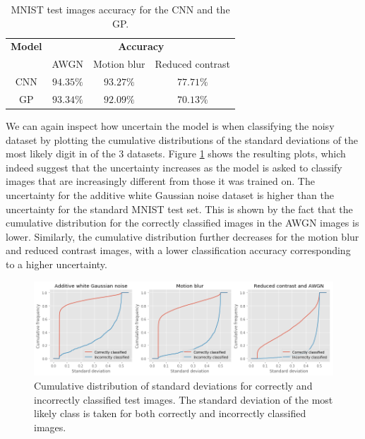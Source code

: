 \documentclass{article}
\begin{document}
\begin{table}[h]
\centering	
{\renewcommand{\arraystretch}{1.4} %
\begin{tabular}{ c | c c c}
\textbf{Model} & \multicolumn{3}{c}{\textbf{Accuracy}}\\
& AWGN & Motion blur & Reduced contrast\\
\hline
CNN & $94.35\%$ & $93.27\%$ & $77.71\%$ \\
GP & $93.34\%$  & $92.09\%$ & $70.13\%$ \\
\end{tabular}
}
\caption{MNIST test images accuracy for the CNN and the GP.}
\label{table/noisy_mnist_acc}
\end{table}

We can again inspect how uncertain the model is when classifying the noisy dataset by plotting the cumulative distributions of the standard deviations of the most likely digit in of the 3 datasets. Figure \ref{fig/noisy_mnist_cum_stds} shows the resulting plots, which indeed suggest that the uncertainty increases as the model is asked to classify images that are increasingly different from those it was trained on. The uncertainty for the additive white Gaussian noise dataset is higher than the uncertainty for the standard MNIST test set. This is shown by the fact that the cumulative distribution for the correctly classified images in the AWGN images is lower. Similarly, the cumulative distribution further decreases for the motion blur and reduced contrast images, with a lower classification accuracy corresponding to a higher uncertainty.

\begin{figure}[H]
	\centering
	\includegraphics[scale=0.4]{noisy_mnist_cum_stds}
	\caption{Cumulative distribution of standard deviations for correctly and incorrectly classified test images. The standard deviation of the most likely class is taken for both correctly and incorrectly classified images.}
	\label{fig/noisy_mnist_cum_stds}
\end{figure}
\end{document}
